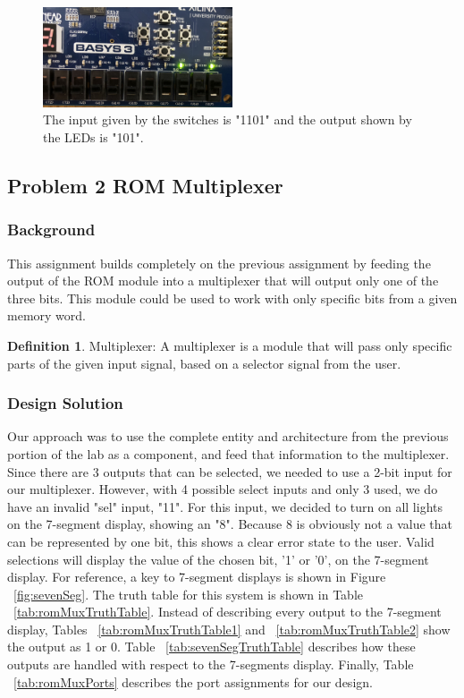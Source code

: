 \documentclass[11pt]{article}
\begin{document}
\begin{figure}[H]
\begin{center}
	\includegraphics[width=0.5\textwidth]{../report-images/Part1/IMG_3090.jpg}
	\caption{\label{fig:p1img9}The input given by the switches is "1101" and the output shown by the LEDs is "101".}
\end{center}
\end{figure}

\subsection{Problem 2 ROM Multiplexer}

\subsubsection{Background}
This assignment builds completely on the previous assignment by feeding the output of the ROM module into a multiplexer that will output only one of the three bits. This module could be used to work with only specific bits from a given memory word.

\theoremstyle{definition}
\newtheorem{definition}{Definition}
\begin{definition}
Multiplexer: A multiplexer is a module that will pass only specific parts of the given input signal, based on a selector signal from the user.
\end{definition}

\subsubsection{Design Solution}
Our approach was to use the complete entity and architecture from the previous portion of the lab as a component, and feed that information to the multiplexer. Since there are 3 outputs that can be selected, we needed to use a 2-bit input for our multiplexer. However, with 4 possible select inputs and only 3 used, we do have an invalid "sel" input, "11". For this input, we decided to turn on all lights on the 7-segment display, showing an "8". Because 8 is obviously not a value that can be represented by one bit, this shows a clear error state to the user. Valid selections will display the value of the chosen bit, '1' or '0', on the 7-segment display. For reference, a key to 7-segment displays is shown in Figure ~\ref{fig:sevenSeg}. The truth table for this system is shown in Table ~\ref{tab:romMuxTruthTable}. Instead of describing every output to the 7-segment display, Tables ~\ref{tab:romMuxTruthTable1} and ~\ref{tab:romMuxTruthTable2} show the output as 1 or 0. Table ~\ref{tab:sevenSegTruthTable} describes how these outputs are handled with respect to the 7-segments display. Finally, Table ~\ref{tab:romMuxPorts} describes the port assignments for our design.
\end{document}

